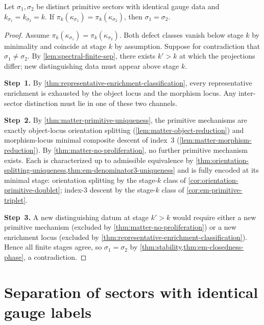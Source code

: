 \begin{lemma}
\label{lem:spectral-stage-rigidity}
Let $\sigma_1, \sigma_2$ be distinct primitive sectors with identical
gauge data and $k_{\sigma_1} = k_{\sigma_2} = k$.
If $\pi_k(\kappa_{\sigma_1}) = \pi_k(\kappa_{\sigma_2})$, then
$\sigma_1 = \sigma_2$.
\end{lemma}

\begin{proof}
Assume $\pi_k(\kappa_{\sigma_1}) = \pi_k(\kappa_{\sigma_2})$.
Both defect classes vanish below stage $k$ by minimality and coincide at
stage $k$ by assumption.
Suppose for contradiction that $\sigma_1 \neq \sigma_2$.
By \cref{lem:spectral-finite-sep}, there exists $k' > k$ at which the
projections differ; new distinguishing data must appear above stage $k$.

\textbf{Step~1.}
By \cref{thm:representative-enrichment-classification}, every
representative enrichment is exhausted by the object locus and the
morphism locus.
Any inter-sector distinction must lie in one of these two channels.

\textbf{Step~2.}
By \cref{thm:matter-primitive-uniqueness}, the primitive mechanisms are
exactly object-locus orientation splitting
(\cref{lem:matter-object-reduction}) and morphism-locus minimal
composite descent of index~$3$ (\cref{lem:matter-morphism-reduction}).
By \cref{thm:matter-no-proliferation}, no further primitive mechanism
exists.
Each is characterized up to admissible equivalence by
\cref{thm:orientation-splitting-uniqueness,thm:em-denominator3-uniqueness}
and is fully encoded at its minimal stage: orientation splitting by the
stage-$k$ class of \cref{cor:orientation-primitive-doublet};
index-$3$ descent by the stage-$k$ class of \cref{cor:em-primitive-triplet}.

\textbf{Step~3.}
A new distinguishing datum at stage $k' > k$ would require either a new
primitive mechanism (excluded by \cref{thm:matter-no-proliferation}) or a
new enrichment locus (excluded by
\cref{thm:representative-enrichment-classification}).
Hence all finite stages agree, so $\sigma_1 = \sigma_2$ by
\cref{thm:stability,thm:em-closedness-phase}, a contradiction.
\end{proof}

\section{Separation of sectors with identical gauge labels}
\label{sec:spectral-separation}

